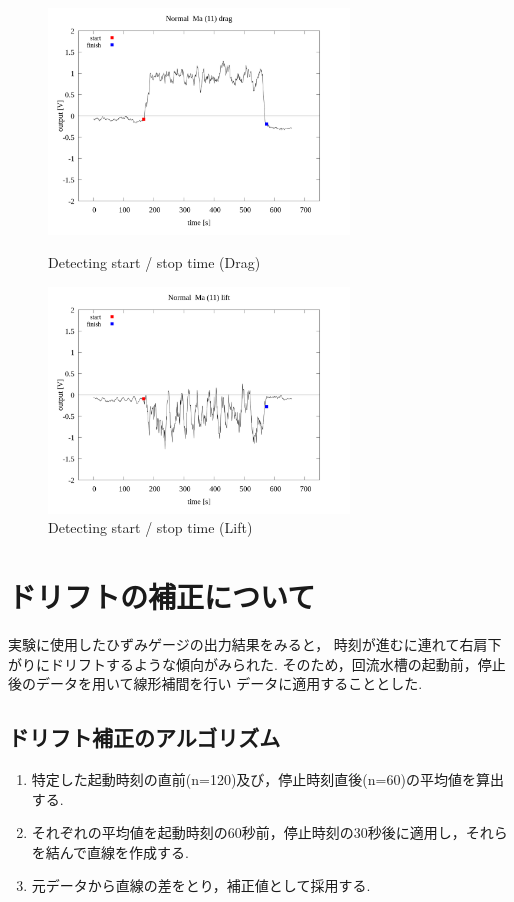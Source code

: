 \documentclass[twocolumn,a4j]{jsarticle}
\begin{document}
\begin{figure}[htbp]
    \footnotesize
    \begin{center}
        \includegraphics[width=80mm]{images/Normal_ma(11)_drag_02.png}
        \caption{Detecting start / stop time (Drag)}
        \includegraphics[width=80mm]{images/Normal_ma(11)_lift_02.png}
        \caption{Detecting start / stop time (Lift)}
    \end{center}
\end{figure}
\newpage
\section{ドリフトの補正について}
実験に使用したひずみゲージの出力結果をみると，
時刻が進むに連れて右肩下がりにドリフトするような傾向がみられた.
そのため，回流水槽の起動前，停止後のデータを用いて線形補間を行い
データに適用することとした.

\subsection{ドリフト補正のアルゴリズム}
\begin{enumerate}[(1)]
    \item 特定した起動時刻の直前(n=120)及び，停止時刻直後(n=60)の平均値を算出する.
    \item それぞれの平均値を起動時刻の60秒前，停止時刻の30秒後に適用し，それらを結んで直線を作成する.
    \item 元データから直線の差をとり，補正値として採用する.
\end{enumerate}
\end{document}
